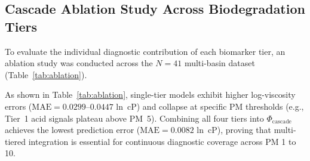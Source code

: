 \documentclass[review,12pt]{elsarticle}
\begin{document}
\subsection{Cascade Ablation Study Across Biodegradation Tiers}
To evaluate the individual diagnostic contribution of each biomarker tier, an ablation study was conducted across the $N=41$ multi-basin dataset (Table~\ref{tab:ablation}). 

\begin{table}[htbp]
\centering
\caption{Ablation study evaluating predictive accuracy across individual biomarker tiers and cumulative cascade configurations.}
\label{tab:ablation}
\end{table}

As shown in Table~\ref{tab:ablation}, single-tier models exhibit higher log-viscosity errors ($\text{MAE} = 0.0299\text{--}0.0447$ ln~cP) and collapse at specific PM thresholds (e.g., Tier~1 acid signals plateau above PM~5). Combining all four tiers into $\Phi_{\text{cascade}}$ achieves the lowest prediction error ($\text{MAE} = 0.0082$ ln~cP), proving that multi-tiered integration is essential for continuous diagnostic coverage across PM 1 to 10.
\end{document}
